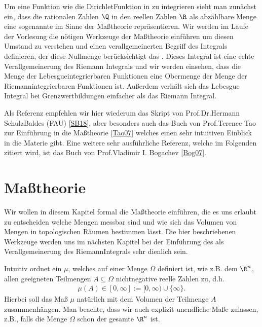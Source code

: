\documentclass[letterpaper,10pt,german]{jupyterBook}
\begin{document}
\sphinxAtStartPar
Um eine Funktion wie die Dirichlet\sphinxhyphen{}Funktion in {\hyperref[\detokenize{masstheorie/intro_masstheorie:ex:dirichletFunktion}]{}} zu integrieren sieht man zunächst ein, dass die rationalen Zahlen \(\Q\) in den reellen Zahlen \(\R\) als abzählbare Menge eine sogenannte  im Sinne der Maßtheorie repräsentieren.
Wir werden im Laufe der Vorlesung die nötigen Werkzeuge der Maßtheorie einführen um diesen Umstand zu verstehen und einen verallgemeinerten Begriff des Integrals definieren, der diese Nullmenge berücksichtigt \sphinxhyphen{} das .
Dieses Integral ist eine echte Verallgemeinerung des Riemann Integrals und wir werden einsehen, dass die Menge der Lebesgue\sphinxhyphen{}integrierbaren Funktionen eine Obermenge der Menge der Riemann\sphinxhyphen{}integrierbaren Funktionen ist.
Außerdem verhält sich das Lebesgue Integral bei Grenzwertbildungen einfacher als das Riemann Integral.

\sphinxAtStartPar
Als Referenz empfehlen wir hier wiederum das Skript von Prof.Dr.Hermann Schulz\sphinxhyphen{}Baldes (FAU) {[}\hyperlink{cite.references:id12}{SB18}{]}, aber besonders auch das Buch von Prof.Terence Tao zur Einführung in die Maßtheorie {[}\hyperlink{cite.references:id6}{Tao07}{]} welches einen sehr intuitiven Einblick in die Materie gibt. Eine weitere sehr ausführliche Referenz, welche im Folgenden zitiert wird, ist das Buch von Prof.Vladimir I. Bogachev {[}\hyperlink{cite.references:id5}{Bog07}{]}.


\section{Maßtheorie}
\label{\detokenize{masstheorie/masstheorie:masztheorie}}\label{\detokenize{masstheorie/masstheorie::doc}}
\sphinxAtStartPar
Wir wollen in diesem Kapitel formal die Maßtheorie einführen, die es uns erlaubt zu entscheiden welche Mengen messbar sind und wie sich das Volumen von Mengen in topologischen Räumen bestimmen lässt.
Die hier beschriebenen Werkzeuge werden uns im nächsten Kapitel bei der Einführung des  als Verallgemeinerung des Riemann\sphinxhyphen{}Integrals sehr dienlich sein.

\sphinxAtStartPar
Intuitiv ordnet ein  \(\mu\), welches auf einer Menge \(\Omega\) definiert ist, wie z.B. dem \(\R^n\), allen geeigneten Teilmengen \(A\subseteq \Omega\) nichtnegative reelle Zahlen zu, d.h.
\begin{equation*}
\begin{split}\mu(A)\in[0,\infty] := [0,\infty)\cup\{\infty\}.\end{split}
\end{equation*}
\sphinxAtStartPar
Hierbei soll das Maß \(\mu\) natürlich mit dem Volumen der Teilmenge \(A\) zusammenhängen.
Man beachte, dass wir auch explizit unendliche Maße zulassen, z.B., falls die Menge \(\Omega\) schon der gesamte \(\R^n\) ist.
\end{document}
